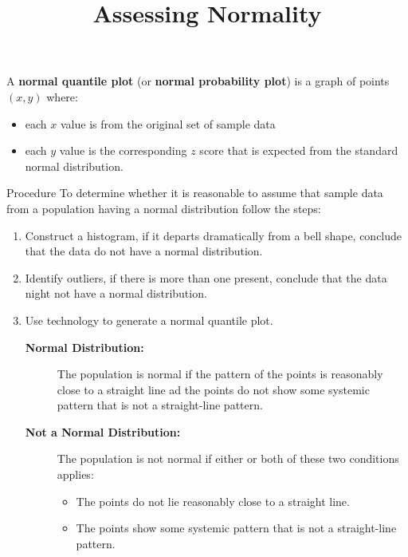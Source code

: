 \documentclass{beamer}
\title[MA205 - Section 6.5]{Assessing Normality}
\begin{document}
\begin{frame}
\titlepage
\end{frame}

\begin{frame}
\begin{definition}
A \textbf{normal quantile plot} (or \textbf{normal probability plot}) is a graph of points $(x,y)$ where:
\begin{itemize}
\item each $x$ value is from the original set of sample data
\item each $y$ value is the corresponding $z$ score that is expected from the standard normal distribution.
\end{itemize}
\end{definition}
\end{frame}

\begin{frame}
\begin{block}{Procedure}
To determine whether it is reasonable to assume that sample data from a population having a normal distribution follow the steps:\pause
\begin{enumerate}
\item Construct a histogram, if it departs dramatically from a bell shape, conclude that the data do not have a normal distribution.\pause
\item Identify outliers, if there is more than one present, conclude that the data night not have a normal distribution.\pause
\item Use technology to generate a normal quantile plot. \pause\begin{description}
\item[\textbf{Normal Distribution:}] The population is normal if the pattern of the points is reasonably close to a straight line ad the points do not show some systemic pattern that is not a straight-line pattern.\pause
\item[\textbf{Not a Normal Distribution:}] The population is not normal if either or both of these two conditions applies:\pause
\begin{itemize}
\item The points do not lie reasonably close to a straight line.\pause
\item The points show some systemic pattern that is not a straight-line pattern.
\end{itemize}
\end{description}
\end{enumerate}
\end{block}
\end{frame}
\end{document}
